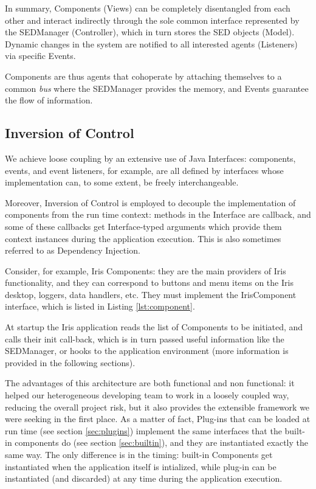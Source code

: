 In summary, Components (Views) can be completely disentangled from each other and interact indirectly through the sole common interface represented by the SEDManager (Controller), which in turn stores the SED objects (Model). Dynamic changes in the system are notified to all interested agents (Listeners) via specific Events.

Components are thus agents that cohoperate by attaching themselves to a common \emph{bus} where the SEDManager provides the memory, and Events guarantee the flow of information.

\subsection{Inversion of Control}
We achieve loose coupling by an extensive use of Java Interfaces: components, events, and event listeners, for example, are all defined by interfaces whose implementation can, to some extent, be freely interchangeable.

Moreover, Inversion of Control is employed to decouple the implementation of components from the run time context: methods in the Interface are callback, and some of these callbacks get Interface-typed arguments which provide them context instances during the application execution. This is also sometimes referred to as Dependency Injection.

Consider, for example, Iris Components: they are the main providers of Iris functionality, and they can correspond to buttons and menu items on the Iris desktop, loggers, data handlers, etc. They must implement the IrisComponent interface, which is listed in Listing \ref{lst:component}.

At startup the Iris application reads the list of Components to be initiated, and calls their init call-back, which is in turn passed useful information like the SEDManager, or hooks to the application environment (more information is provided in the following sections).

The advantages of this architecture are both functional and non functional: it helped our heterogeneous developing team to work in a loosely coupled way, reducing the overall project risk, but it also provides the extensible framework we were seeking in the first place. As a matter of fact, Plug-ins that can be loaded at run time (see section \ref{sec:plugins}) implement the same interfaces that the built-in components do (see section \ref{sec:builtin}), and they are instantiated exactly the same way. The only difference is in the timing: built-in Components get instantiated when the application itself is intialized, while plug-in can be instantiated (and discarded) at any time during the application execution.